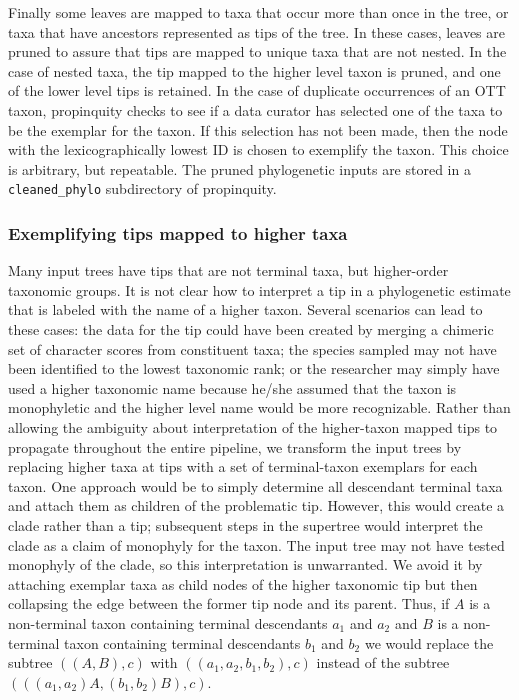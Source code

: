 \documentclass[fleqn,12pt,lineno,english]{wlpeerj}
\begin{document}
Finally some leaves are mapped to taxa that occur more than once in
the tree, or taxa that have ancestors represented as tips of the tree.
In these cases, leaves are pruned to assure that tips are mapped to
unique taxa that are not nested. In the case of nested taxa, the tip
mapped to the higher level taxon is pruned, and one of the lower level
tips is retained. In the case of duplicate occurrences of an OTT taxon,
propinquity checks to see if a data curator has selected one of the
taxa to be the exemplar for the taxon. If this selection has not been
made, then the node with the lexicographically lowest ID is chosen
to exemplify the taxon. This choice is arbitrary, but repeatable.
The pruned phylogenetic inputs are stored in a \texttt{cleaned\_phylo}
subdirectory of propinquity.

\subsubsection{Exemplifying tips mapped to higher taxa}

Many input trees have tips that are not terminal taxa, but higher-order
taxonomic groups. It is not clear how to interpret a tip in a phylogenetic
estimate that is labeled with the name of a higher taxon. Several
scenarios can lead to these cases: the data for the tip could have
been created by merging a chimeric set of character scores from constituent
taxa; the species sampled may not have been identified to the lowest
taxonomic rank; or the researcher may simply have used a higher taxonomic
name because he/she assumed that the taxon is monophyletic and the
higher level name would be more recognizable. Rather than allowing
the ambiguity about interpretation of the higher-taxon mapped tips
to propagate throughout the entire pipeline, we transform the input
trees by replacing higher taxa at tips with a set of terminal-taxon
exemplars for each taxon. One approach would be to simply determine
all descendant terminal taxa and attach them as children of the problematic
tip. However, this would create a clade rather than a tip; subsequent
steps in the supertree would interpret the clade as a claim of monophyly
for the taxon. The input tree may not have tested monophyly of the
clade, so this interpretation is unwarranted. We avoid it by attaching
exemplar taxa as child nodes of the higher taxonomic tip but then
collapsing the edge between the former tip node and
its parent. Thus, if $A$ is a non-terminal taxon containing terminal
descendants $a_{1}$ and $a_{2}$ and $B$ is a non-terminal taxon
containing terminal descendants $b_{1}$ and $b_{2}$ we would replace
the subtree $((A,B),c)$ with $((a_{1},a_{2},b_{1},b_{2}),c)$ instead
of the subtree $(((a_{1},a_{2})A,(b_{1},b_{2})B),c)$.
\end{document}
